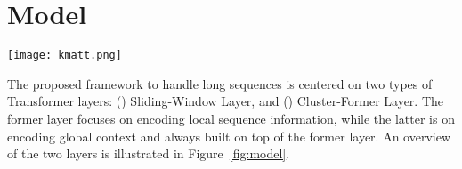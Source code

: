 \documentclass[11pt,a4paper]{article}
\begin{document}
\begin{comment}
\paragraph{Transformer architecture optimization}
There are two popular ways  to optimize the structure of Transformer. 
One is to optimize the self-attention mechanism.
The other is to compress the large pre-trained model into smaller one by knowledge distillation.


Even though some NLP tasks may have longer context to process, they still rely heavily on the local information.
In this way, our model consists of two strategies, which focus on the local information in the sequence windows nearby and global information beyond the nearby windows respectively, to encode long sequence in different Transformer layers.
For the first strategy, after chunking the long sequence by sliding window, we will not encode the sequence in window sides independently, but merge the overlap of hidden states in the same positions as the input of the next layer.
Thus the information from nearby sequences in windows can always be shared.
For the second strategy, we will cluster the hidden states and run Transformer layer on each cluster separately, so that each hidden state may be enriched by the similar information beyond nearby windows.
Note that our cluster centers are not online computed for each sequence, but based on the hidden states in the memory bank of each layer.
The method is close to Reformer~\citet{reformer} by replacing the random hashing vectors with our cluster centers in memory bank.
However, as we are processing longer sequence than Reformer~\citet{reformer}, we need more clusters to assign the hidden state more accurately.
And we will greedily sort the cluster centers by the nearest neighbour, so that the hidden states in nearby buckets can compensate each other for making the sequences in the same size.
\end{comment} \section{Model}
\begin{figure*}[t]
\centering
\texttt{[image: kmatt.png]}
\caption{An overview of two types of Transformer layer. (a): Sliding-window layer over a sequence. The question is omitted here for simplicity. (b) Cluster-Former layer over clustered hidden states from the output of (a). The cluster centroids are periodically updated based on the memory bank of the hidden states in the corresponding layer. Note that the sequence inputs in (a) and (b) usually come from two different samples.}
\label{fig:model}
\end{figure*}
The proposed framework to handle long sequences is centered on two types of Transformer layers: () Sliding-Window Layer, and () Cluster-Former Layer. 
The former layer focuses on encoding local sequence information, while the latter is on encoding global context and always built on top of the former layer.
An overview of the two layers is illustrated in Figure~\ref{fig:model}.
\end{document}
